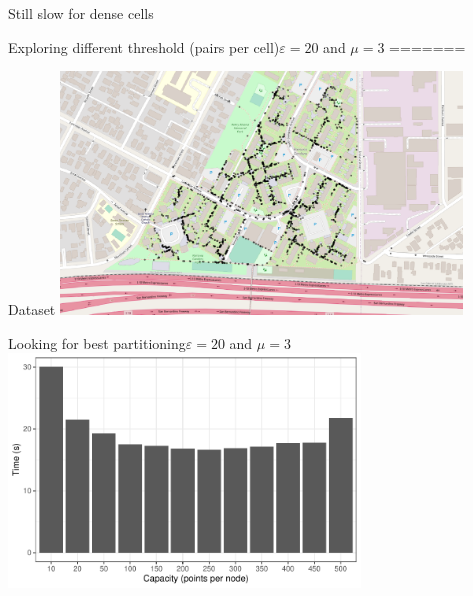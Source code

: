 \documentclass{beamer}
\begin{document}
\begin{frame}{Still slow for dense cells}


\begin{frame}{Exploring different threshold (pairs per cell)}{$\varepsilon=20$ and $\mu=3$}
=======
\begin{frame}{Dataset}
    \centering
    \includegraphics[width=0.8\textwidth]{figures/dataset}
\end{frame}

\begin{frame}{Looking for best partitioning}{$\varepsilon=20$ and $\mu=3$}
    \centering
    \includegraphics[width=0.7\textwidth]{figures/Capacity/capacity}
\end{frame}


\end{frame}
\end{frame}
\end{document}
